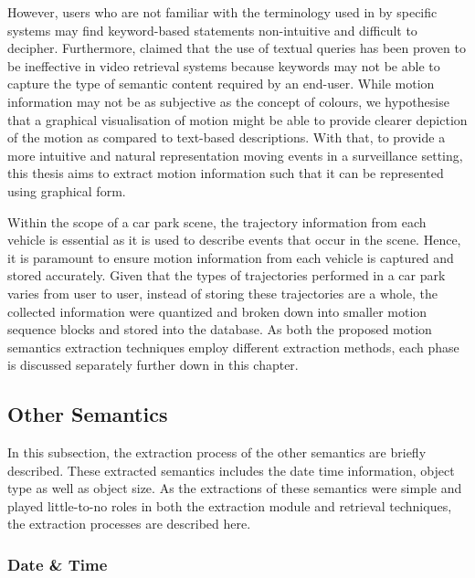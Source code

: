 However, users who are not familiar with the terminology used in by specific systems may find keyword-based statements non-intuitive and difficult to decipher.
Furthermore,  claimed that the use of textual queries has been proven to be ineffective in video retrieval systems because keywords may not be able to capture the type of semantic content required by an end-user.
While motion information may not be as subjective as the concept of colours, we hypothesise that a graphical visualisation of motion might be able to provide clearer depiction of the motion as compared to text-based descriptions.
With that, to provide a more intuitive and natural representation moving events in a surveillance setting, this thesis aims to extract motion information such that it can be represented using graphical form.

Within the scope of a car park scene, the trajectory information from each vehicle is essential as it is used to describe events that occur in the scene.
Hence, it is paramount to ensure motion information from each vehicle is captured and stored accurately.
Given that the types of trajectories performed in a car park varies from user to user, instead of storing these trajectories are a whole, the collected information were quantized and broken down into smaller motion sequence blocks and stored into the database.
As both the proposed motion semantics extraction techniques employ different extraction methods, each phase is discussed separately further down in this chapter.

\subsection{Other Semantics}

In this subsection, the extraction process of the other semantics are briefly described. These extracted semantics includes the date time information, object type as well as object size. As the extractions of these semantics were simple and played little-to-no roles in both the extraction module and retrieval techniques, the extraction processes are described here.

\subsubsection{Date \& Time}

